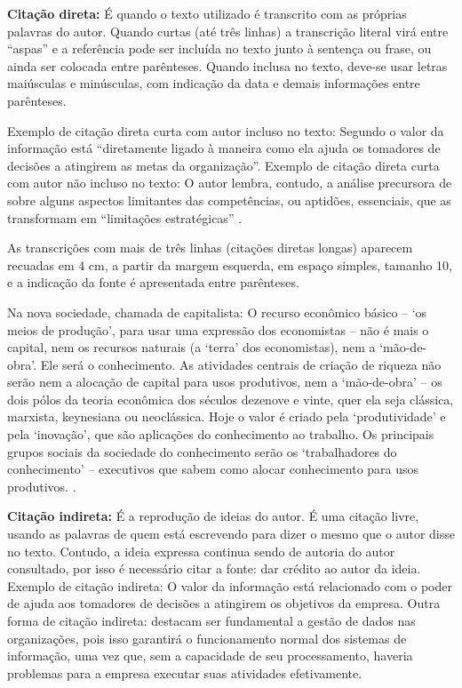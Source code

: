 \textbf{Citação direta:} É quando o texto utilizado é transcrito com as próprias palavras do autor. Quando curtas (até três linhas) a transcrição literal virá entre “aspas” e a referência pode ser incluída no texto junto à sentença ou frase, ou ainda ser colocada entre parênteses. Quando inclusa no texto, deve-se usar letras maiúsculas e minúsculas, com indicação da data e demais informações entre parênteses.

Exemplo de citação direta curta com autor incluso no texto: Segundo  o valor da informação está “diretamente ligado à maneira como ela ajuda os tomadores de decisões a atingirem as metas da organização”. Exemplo de citação direta curta com autor não incluso no texto: O autor lembra, contudo, a análise precursora de  sobre alguns aspectos limitantes das competências, ou aptidões, essenciais, que as transformam em “limitações estratégicas” \cite{Pressman2009}.

As transcrições com mais de três linhas (citações diretas longas) aparecem recuadas em 4 cm, a partir da margem esquerda, em espaço simples, tamanho 10, e a indicação da fonte é apresentada entre parênteses.

\begin{citacao}
	Na nova sociedade, chamada de capitalista: O recurso econômico básico – ‘os meios de produção’, para usar uma expressão dos economistas – não é mais o capital, nem os recursos naturais (a ‘terra’ dos economistas), nem a ‘mão-de-obra’. Ele será o conhecimento. As atividades centrais de criação de riqueza não serão nem a alocação de capital para usos produtivos, nem a ‘mão-de-obra’ – os dois pólos da teoria econômica dos séculos dezenove e vinte, quer ela seja clássica, marxista, keynesiana ou neoclássica. Hoje o valor é criado pela ‘produtividade’ e pela ‘inovação’, que são aplicações do conhecimento ao trabalho. Os principais grupos sociais da sociedade do conhecimento serão os ‘trabalhadores do conhecimento’ – executivos que sabem como alocar conhecimento para usos produtivos. \cite[p. 48]{Pressman2009}.
\end{citacao}

\textbf{Citação indireta:} É a reprodução de ideias do autor. É uma citação livre, usando as palavras de quem está escrevendo para dizer o mesmo que o autor disse no texto. Contudo, a ideia expressa continua sendo de autoria do autor consultado, por isso é necessário citar a fonte: dar crédito ao autor da ideia. Exemplo de citação indireta: O valor da informação está relacionado com o poder de ajuda aos tomadores de decisões a atingirem os objetivos da empresa\cite{Pressman2009}. Outra forma de citação indireta:  destacam ser fundamental a gestão de dados nas organizações, pois isso garantirá o funcionamento normal dos sistemas de informação, uma vez que, sem a capacidade de seu processamento, haveria problemas para a empresa executar suas atividades efetivamente.

